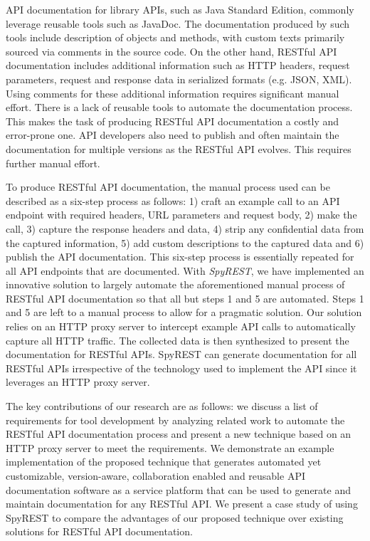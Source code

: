 API documentation for library APIs, such as Java Standard Edition, commonly leverage reusable tools such as JavaDoc. The documentation produced by such tools include description of objects and methods, with custom texts primarily sourced via comments in the source code. On the other hand, RESTful API documentation includes additional information such as HTTP headers, request parameters, request and response data in serialized formats (e.g. JSON, XML). Using comments for these additional information requires significant manual effort. There is a lack of reusable tools to automate the documentation process. This makes the task of producing RESTful API documentation a costly and error-prone one. API developers also need to publish and often maintain the documentation for multiple versions as the RESTful API evolves. This requires further manual effort.

To produce RESTful API documentation, the manual process used can be described as a six-step process as follows: 1) craft an example call to an API endpoint with required headers, URL parameters and request body, 2) make the call, 3) capture the response headers and data, 4) strip any confidential data from the captured information, 5) add custom descriptions to the captured data and 6) publish the API documentation. This six-step process is essentially repeated for all API endpoints that are documented. With \emph{SpyREST}, we have implemented an innovative solution to largely automate the aforementioned manual process of RESTful API documentation so that all but steps 1 and 5 are automated. Steps 1 and 5 are left to a manual process to allow for a pragmatic solution. Our solution relies on an HTTP proxy server to intercept example API calls to automatically capture all HTTP traffic. The collected data is then synthesized to present the documentation for RESTful APIs. SpyREST can generate documentation for all RESTful APIs irrespective of the technology used to implement the API since it leverages an HTTP proxy server.

The key contributions of our research are as follows: we discuss a list of requirements for tool development by analyzing related work to automate the RESTful API documentation process and present a new technique based on an HTTP proxy server to meet the requirements. We demonstrate an example implementation of the proposed technique that generates automated yet customizable, version-aware, collaboration enabled and reusable API documentation software as a service platform that can be used to generate and maintain documentation for any RESTful API. We present a case study of using SpyREST to compare the advantages of our proposed technique over existing solutions for RESTful API documentation.

